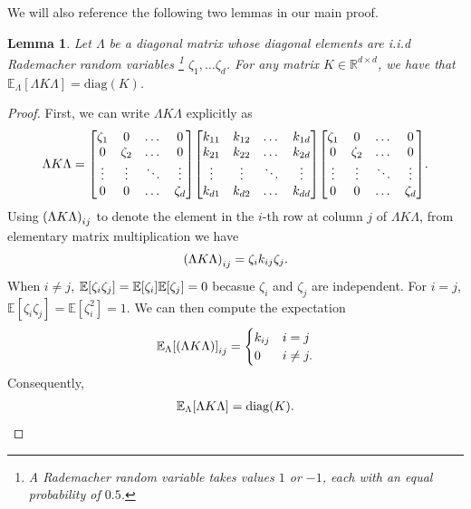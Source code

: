 \documentclass{article}
\newcommand{\R}{\mathbb{R}}
\newcommand{\E}{\mathbb{E}}
\newcommand{\diag}{\text{diag}}
\newtheorem{lemma}{Lemma}[subsection]
\begin{document}
We will also reference the following two lemmas in our main proof.
\begin{lemma}
\label{lemma: rademacher diagonal}
    Let $\Lambda$ be a diagonal matrix whose diagonal elements are i.i.d Rademacher random variables  \footnote{A Rademacher random variable takes values $1$ or $-1$, each with an equal probability of $0.5$.} $\zeta_1, \dots \zeta_d$.
    For any matrix $K \in \R^{d\times d}$, we have that $\E_\Lambda[\Lambda K \Lambda] = \diag(K)$.
\end{lemma}
\begin{proof}
     First, we can write $\Lambda K \Lambda$ explicitly as
    \begin{align}
        \Lambda K \Lambda = \mqty[\zeta_1 & 0& \dots & 0 \\
        0 & \zeta_2 & \dots & 0 \\
        \vdots & \vdots & \ddots & \vdots \\
        0 & 0& \dots & \zeta_d]
        \mqty[k_{11} & k_{12}& \dots & k_{1d} \\
        k_{21} & k_{22}& \dots & k_{2d} \\
        \vdots & \vdots & \ddots & \vdots \\
        k_{d1} & k_{d2}& \dots & k_{dd}]
        \mqty[\zeta_1 & 0& \dots & 0 \\
        0 & \zeta_2 & \dots & 0 \\
        \vdots & \vdots & \ddots & \vdots \\
        0 & 0& \dots & \zeta_d].
    \end{align}
    Using $\qty(\Lambda K \Lambda)_{ij}$ to denote the element in the $i$-th row at column $j$ of $\Lambda K \Lambda$, from elementary matrix multiplication we have
    \begin{align}
        \qty(\Lambda K \Lambda)_{ij} = \zeta_i k_{ij} \zeta_j.
    \end{align}
    When $i \neq j$, $\E\qty[\zeta_i \zeta_j] = \E\qty[\zeta_i]\E\qty[\zeta_j] = 0$ becasue $\zeta_i$ and $\zeta_j$ are independent.
    For $i=j$, $\E[\zeta_i \zeta_j] = \E[\zeta_i^2] = 1$.
    We can then compute the expectation
    \begin{align}
        \E_\Lambda \qty[\qty(\Lambda K \Lambda)]_{ij} =
        \begin{cases}
            k_{ij} &  i=j \\
            0 & i\neq j.
        \end{cases}
    \end{align}
Consequently,
\begin{align}
    \E_\Lambda \qty[\Lambda K \Lambda] = \diag(K).
\end{align}
\end{proof}
\end{document}
